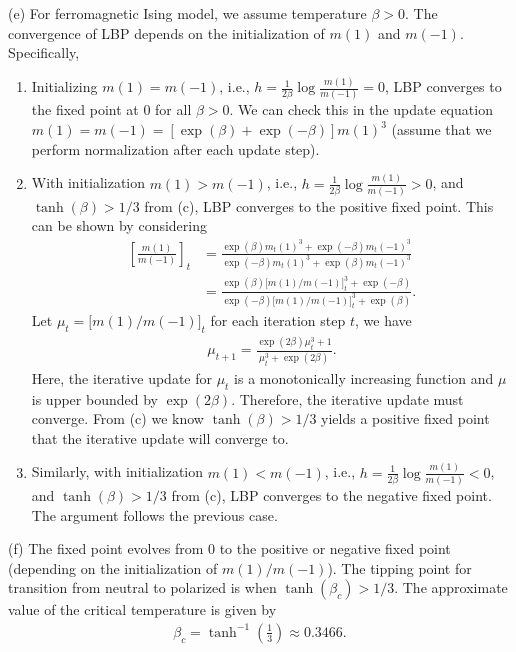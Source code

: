 \documentclass{article}
\begin{document}
\noindent
(e) For ferromagnetic Ising model, we assume temperature $\beta >0$. The convergence of LBP depends on the 
initialization of $m(1)$ and $m(-1)$. Specifically,
\begin{enumerate}
	\item Initializing $m(1) = m(-1)$, i.e., $h=\frac{1}{2\beta}\log \frac{m(1)}{m(-1)} = 0$, LBP converges to
	the fixed point at 0 for all $\beta > 0$. We can check this in the update equation
	$m(1) = m(-1) = [\exp(\beta) + \exp(-\beta)]m(1)^3$
	(assume that we perform normalization after each update step).
	\item With initialization $m(1) > m(-1)$, i.e., $h=\frac{1}{2\beta}\log \frac{m(1)}{m(-1)} > 0$, and
	$\tanh(\beta) > 1/3$ from (c), LBP 
	converges to the positive fixed point. This can be shown by considering
	\begin{align*}
		\left[\frac{m(1)}{m(-1)}\right]_t &= 
		\frac{\exp(\beta)m_t(1)^3 + \exp(-\beta)m_t(-1)^3}{\exp(-\beta)m_t(1)^3 + \exp(\beta)m_t(-1)^3}\\
		&=\frac{\exp(\beta)\big[m(1)/m(-1)\big]_t^3 +
		\exp(-\beta)}{\exp(-\beta)\big[m(1)/m(-1)\big]_t^3 + \exp(\beta)}.
	\end{align*}
	Let $\mu_t = \big[m(1)/m(-1)\big]_t$ for each iteration step $t$, we have
	\begin{align*}
		\mu_{t+1} = \frac{\exp(2\beta)\mu_t^3 + 1}{\mu_t^3 + \exp(2\beta)}.
	\end{align*}
	Here, the iterative update for $\mu_t$ is a monotonically increasing function and $\mu$ is upper bounded
	by $\exp(2\beta)$. Therefore, the iterative update must converge. From (c) we know $\tanh(\beta) > 1/3$ 
	yields a positive fixed point that the iterative update will converge to.
	\item Similarly, with initialization $m(1) < m(-1)$, 
	i.e., $h=\frac{1}{2\beta}\log \frac{m(1)}{m(-1)} < 0$, and
	$\tanh(\beta) > 1/3$ from (c), LBP 
	converges to the negative fixed point. The argument follows the previous case.
\end{enumerate}

\noindent
(f) The fixed point evolves from 0 to the positive or negative fixed point (depending on the initialization of $m(1)/m(-1)$). The tipping point for transition from neutral to polarized is when $\tanh(\beta_c) > 1/3$. The approximate value of the critical temperature is given by
\begin{align*}
	\beta_c = \tanh^{-1}\left(\frac{1}{3}\right)\approx0.3466.
\end{align*}
\end{document}
